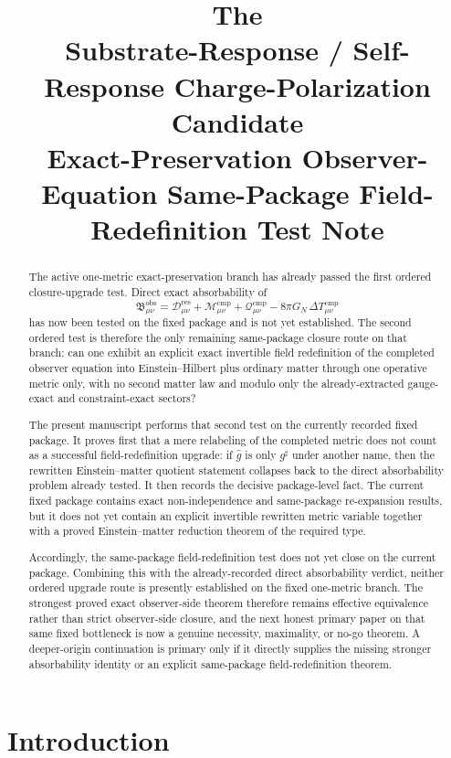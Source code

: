 \documentclass[11pt]{article}
\title{\textbf{The \TheoryName{}}\\[0.4em]
\large Substrate-Response / Self-Response Charge-Polarization Candidate\\
\large Exact-Preservation Observer-Equation Same-Package Field-Redefinition Test Note}
\author{}
\date{}
\newcommand{\CompletedMetric}{g^{\sharp}}
\newcommand{\RedefMetric}{\widehat g}
\newcommand{\ResidualDec}{\mathcal D_{\mu\nu}^{\mathrm{res}}}
\newcommand{\CompMix}{\mathcal M_{\mu\nu}^{\mathrm{cmp}}}
\newcommand{\CompQuad}{\mathcal Q_{\mu\nu}^{\mathrm{cmp}}}
\newcommand{\DeltaTComp}{\Delta T_{\mu\nu}^{\mathrm{cmp}}}
\newcommand{\ObsBurden}{\mathfrak B_{\mu\nu}^{\mathrm{obs}}}
\begin{document}
\maketitle

\begin{abstract}
The active one-metric exact-preservation branch has already passed the first ordered closure-upgrade test. Direct exact absorbability of
\[
\ObsBurden
=
\ResidualDec+\CompMix+\CompQuad-8\pi G_N\,\DeltaTComp
\]
has now been tested on the fixed package and is not yet established. The second ordered test is therefore the only remaining same-package closure route on that branch: can one exhibit an explicit exact invertible field redefinition of the completed observer equation into Einstein--Hilbert plus ordinary matter through one operative metric only, with no second matter law and modulo only the already-extracted gauge-exact and constraint-exact sectors?

The present manuscript performs that second test on the currently recorded fixed package. It proves first that a mere relabeling of the completed metric does not count as a successful field-redefinition upgrade: if \(\RedefMetric\) is only \(\CompletedMetric\) under another name, then the rewritten Einstein--matter quotient statement collapses back to the direct absorbability problem already tested. It then records the decisive package-level fact. The current fixed package contains exact non-independence and same-package re-expansion results, but it does not yet contain an explicit invertible rewritten metric variable together with a proved Einstein--matter reduction theorem of the required type.

Accordingly, the same-package field-redefinition test does not yet close on the current package. Combining this with the already-recorded direct absorbability verdict, neither ordered upgrade route is presently established on the fixed one-metric branch. The strongest proved exact observer-side theorem therefore remains effective equivalence rather than strict observer-side closure, and the next honest primary paper on that same fixed bottleneck is now a genuine necessity, maximality, or no-go theorem. A deeper-origin continuation is primary only if it directly supplies the missing stronger absorbability identity or an explicit same-package field-redefinition theorem.
\end{abstract}

\section{Introduction}
\end{document}
